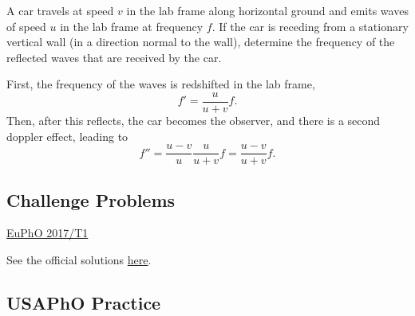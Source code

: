 \documentclass[11pt]{scrartcl}
\newcommand{\officialsol}[1]{See the official solutions \href{#1}{here}.}
\begin{document}
\begin{prob}[Wang]
    A car travels at speed $v$ in the lab frame along horizontal ground and emits
waves of speed $u$ in the lab frame at frequency $f$. If the car is receding from
a stationary vertical wall (in a direction normal to the wall), determine the
frequency of the reflected waves that are received by the car.
\end{prob}
\begin{sol}
    First, the frequency of the waves is redshifted in the lab frame,
    $$f' = \frac{u}{u + v}f.$$
    Then, after this reflects, the car becomes the observer, and there is a second doppler effect, leading to
    $$f'' = \frac{u-v}{u}\frac{u}{u+v}f = \frac{u-v}{u+v}f.$$
\end{sol}


\subsection{Challenge Problems}

\begin{prob}
    \href{https://eupho.ee/wp-content/uploads/2020/07/EuPhO17_theory.pdf}{EuPhO 2017/T1}
\end{prob}
\begin{sol}
    \officialsol{https://eupho.ee/wp-content/uploads/2020/07/EuPhO17_theory_solution_marking.pdf}
\end{sol}

\subsection{USAPhO Practice}
\end{document}
